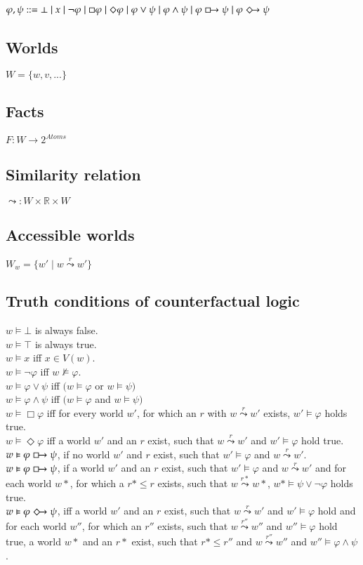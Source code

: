 \documentclass[a4paper,american]{paper}
\begin{document}
$\varphi, \psi ::= \bot \mid x \mid \neg \varphi \mid \Box \varphi \mid \Diamond \varphi \mid \varphi \vee \psi \mid \varphi \wedge \psi \mid \varphi \boxright \psi \mid \varphi \Diamondright \psi$

\subsection{Worlds}
$W = \{w,v,...\}$

\subsection{Facts}
$F \colon W \rightarrow 2^{Atoms}$

\subsection{Similarity relation}
$\leadsto \colon W\times \mathbb{R} \times W$

\subsection{Accessible worlds}
$W_w = \{w'\mid w \overset{r}{\leadsto} w'\}$

\subsection{Truth conditions of counterfactual logic}
$w \vDash \bot$ is always false. \\
$w \vDash \top$ is always true. \\
$w \vDash x$ iff $x \in V(w)$. \\
$w \vDash \neg \varphi$ iff $w \nvDash \varphi$. \\
$w \vDash \varphi \vee \psi$ iff $(w \vDash \varphi$ or $w \vDash \psi)$ \\
$w \vDash \varphi \wedge \psi$ iff $(w \vDash \varphi$ and $w \vDash \psi)$ \\
$w \vDash \Box \varphi$ iff for every world $w'$, for which an $r$ with $w\overset{r}{\leadsto} w'$ exists, $w' \vDash \varphi$ holds true. \\
$w \vDash \Diamond \varphi$ iff a world $w'$ and an $r$ exist, such that $w\overset{r}{\leadsto} w'$ and $w' \vDash \varphi$ hold true. \\
$w \vDash \varphi \boxright \psi$, if no world $w'$ and $r$ exist, such that $w' \vDash \varphi$ and $w\overset{r}{\leadsto} w'$. \\
$w \vDash \varphi \boxright \psi$, if a world $w'$ and an $r$ exist, such that $w'\vDash \varphi$ and $w\overset{r}{\leadsto} w'$ and for each world $w*$, for which a $r*\leq r$ exists, such that $w\overset{r*}{\leadsto} w*$, $w*\vDash\psi\vee\neg\varphi$ holds true. \\
$w \vDash \varphi \Diamondright \psi$, iff a world $w'$ and an $r$ exist, such that $w\overset{r}{\leadsto} w'$ and $w' \vDash \varphi$ hold and for each world $w''$, for which an $r''$ exists, such that $w\overset{r''}{\leadsto}w''$ and $w'' \vDash \varphi$ hold true, a world $w*$ and an $r*$ exist, such that $r* \leq r''$ and $w\overset{r''}{\leadsto}w''$ and $w'' \vDash \varphi \wedge \psi$.
\end{document}
